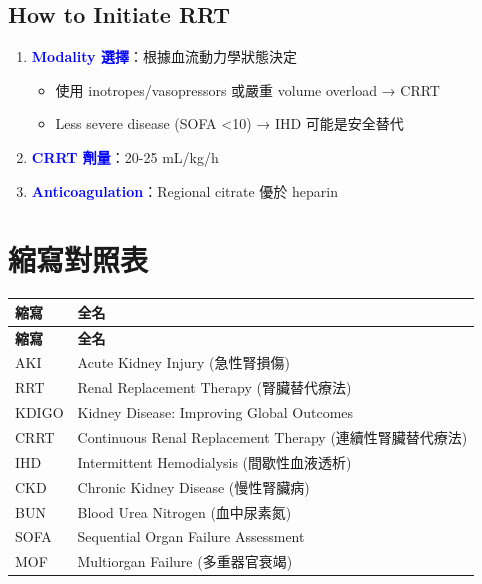 \documentclass[12pt,a4paper]{article}
\begin{document}
\subsection{How to Initiate RRT}

\begin{enumerate}
    \item \textcolor{blue}{\textbf{Modality 選擇}}：根據血流動力學狀態決定
    \begin{itemize}
        \item 使用 inotropes/vasopressors 或嚴重 volume overload → CRRT
        \item Less severe disease (SOFA <10) → IHD 可能是安全替代
    \end{itemize}
    \item \textcolor{blue}{\textbf{CRRT 劑量}}：20-25 mL/kg/h
    \item \textcolor{blue}{\textbf{Anticoagulation}}：Regional citrate 優於 heparin
\end{enumerate}

\section{縮寫對照表}

\begin{longtable}{p{3cm}p{11cm}}
\toprule
\textbf{縮寫} & \textbf{全名} \\
\midrule
\endfirsthead

\toprule
\textbf{縮寫} & \textbf{全名} \\
\midrule
\endhead

\bottomrule
\endfoot

AKI & Acute Kidney Injury (急性腎損傷) \\
RRT & Renal Replacement Therapy (腎臟替代療法) \\
KDIGO & Kidney Disease: Improving Global Outcomes \\
CRRT & Continuous Renal Replacement Therapy (連續性腎臟替代療法) \\
IHD & Intermittent Hemodialysis (間歇性血液透析) \\
CKD & Chronic Kidney Disease (慢性腎臟病) \\
BUN & Blood Urea Nitrogen (血中尿素氮) \\
SOFA & Sequential Organ Failure Assessment \\
MOF & Multiorgan Failure (多重器官衰竭) \\
\bottomrule
\end{longtable}
\end{document}
